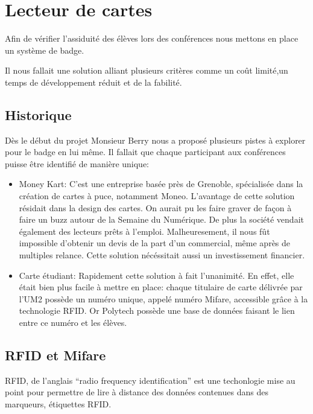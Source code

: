 \chapter{Lecteur de cartes}
Afin de vérifier l'assiduité des élèves lors des conférences nous mettons en
place un système de badge.

Il nous fallait une solution alliant plusieurs critères comme un coût limité,un temps
de développement réduit et de la fabilité.

\newpage



\section{Historique}
Dès le début du projet Monsieur Berry nous a proposé plusieurs pistes à 
explorer pour le badge en lui même. Il fallait que chaque participant aux
conférences puisse être identifié de manière unique:

\begin{itemize}
\item Money Kart: C'est une entreprise basée près de Grenoble, spécialisée
dans la création de cartes à puce, notamment Moneo. L'avantage de cette solution
résidait dans la design des cartes. On aurait pu les faire graver
de façon à faire un buzz autour de la Semaine du Numérique. De plus la société
vendait également des lecteurs prêts à l'emploi.
Malheuresement, il nous fût impossible d'obtenir un devis de la part d'un
commercial, même après de multiples relance. Cette solution nécéssitait aussi
un investissement financier.

\item Carte étudiant: Rapidement cette solution à fait l'unanimité. En effet,
elle était bien plus facile à mettre en place: chaque titulaire de carte délivrée
par l'UM2 possède un numéro unique, appelé numéro Mifare, accessible grâce à
la technologie RFID. Or Polytech possède une base de données faisant le lien entre
ce numéro et les élèves.
\end{itemize}

\section{RFID et Mifare}
RFID, de l'anglais ``radio frequency identification'' est une techonlogie 
mise au point pour permettre de lire à distance des données contenues dans des
marqueurs, étiquettes RFID.

